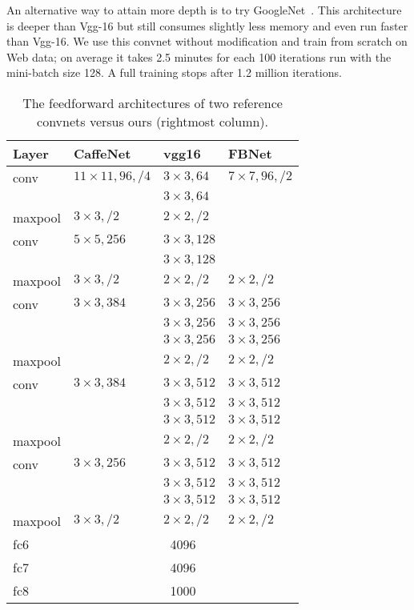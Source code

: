 \documentclass[preprint,12pt]{elsarticle}
\begin{document}
An alternative way to attain more depth is to try  GoogleNet~\cite{DBLP:journals/corr/SzegedyLJSRAEVR14}. This architecture is deeper than Vgg-16 but still consumes slightly less memory and even run faster than Vgg-16. We use this convnet without modification and train from scratch on Web data; on average it takes 2.5 minutes for each 100 iterations run with the mini-batch size 128. A full training stops after 1.2 million iterations.
\begin{table}
\small
\begin{centering}
\begin{tabular}{l|lll}
 Layer & CaffeNet & vgg16 & FBNet \tabularnewline
\hline
conv & $11\times 11, 96, /4$ & $3\times 3, 64$ & $7\times 7, 96, /2$ \tabularnewline
 & & $3\times 3, 64$ & \tabularnewline
 maxpool & $3\times 3, /2$ & $2\times 2, /2$ &  \tabularnewline
 \hline
conv & $5\times 5, 256$ & $3\times 3, 128$ & \tabularnewline
 & & $3\times 3, 128$ & \tabularnewline
 maxpool & $3\times 3, /2$ & $2\times 2, /2$ & $2\times 2, /2$ \tabularnewline
 \hline
conv & $3\times 3, 384$ & $3\times 3, 256$ & $3\times 3, 256$ \tabularnewline
 & & $3\times 3, 256$ & $3\times 3, 256$ \tabularnewline
 & & $3\times 3, 256$ & $3\times 3, 256$ \tabularnewline
 maxpool & & $2\times 2, /2$ & $2\times 2, /2$ \tabularnewline
 \hline
conv & $3\times 3, 384$ & $3\times 3, 512$ & $3\times 3, 512$ \tabularnewline
 & & $3\times 3, 512$ & $3\times 3, 512$ \tabularnewline
 & & $3\times 3, 512$ & $3\times 3, 512$ \tabularnewline
 maxpool & & $2\times 2, /2$ & $2\times 2, /2$ \tabularnewline
 \hline
conv & $3\times 3, 256$ & $3\times 3, 512$ & $3\times 3, 512$ \tabularnewline
 & & $3\times 3, 512$ & $3\times 3, 512$ \tabularnewline
 & & $3\times 3, 512$ & $3\times 3, 512$ \tabularnewline
 maxpool & $3\times 3, /2$ & $2\times 2, /2$ & $2\times 2, /2$ \tabularnewline
 \hline
 fc6 & \multicolumn{3}{c}{4096} \tabularnewline
 fc7 & \multicolumn{3}{c}{4096} \tabularnewline
 fc8 & \multicolumn{3}{c}{1000} \tabularnewline
\end{tabular}
\par\end{centering}
\caption{The feedforward architectures of two reference convnets versus ours (rightmost column).}
\label{table:protos}
\end{table}
\end{document}
